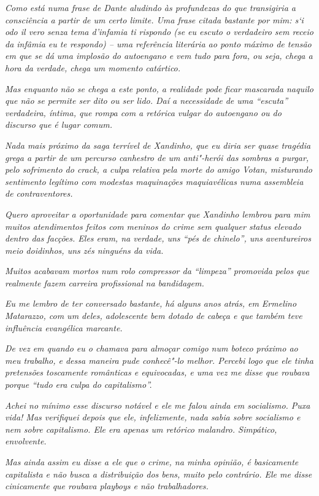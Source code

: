 \emph{Como está numa frase de Dante aludindo às profundezas do que
transigiria a consciência a partir de um certo limite. Uma frase citada
bastante por mim: s`i odo il vero senza tema d'infamia ti rispondo (se
eu escuto o verdadeiro sem receio da infâmia eu te respondo) -- uma
referência literária ao ponto máximo de tensão em que se dá uma implosão
do autoengano e vem tudo para fora, ou seja, chega a hora da verdade,
chega um momento catártico.}

\emph{Mas enquanto não se chega a este ponto, a realidade pode ficar
mascarada naquilo que não se permite ser dito ou ser lido. Daí a
necessidade de uma ``escuta'' verdadeira, íntima, que rompa com a
retórica vulgar do autoengano ou do discurso que é lugar comum.}

\emph{Nada mais próximo da saga terrível de Xandinho, que eu diria ser
quase tragédia grega a partir de um percurso canhestro de um anti"-herói
das sombras a purgar, pelo sofrimento do crack, a culpa relativa pela
morte do amigo Votan, misturando sentimento legítimo com modestas
maquinações maquiavélicas numa assembleia de contraventores.}

\emph{Quero aproveitar a oportunidade para comentar que Xandinho lembrou
para mim muitos atendimentos feitos com meninos do crime sem qualquer
status elevado dentro das facções. Eles eram, na verdade, uns ``pés de
chinelo'', uns aventureiros meio doidinhos, uns zés ninguéns da vida.}

\emph{Muitos acabavam mortos num rolo compressor da ``limpeza''
promovida pelos que realmente fazem carreira profissional na
bandidagem.}

\emph{Eu me lembro de ter conversado bastante, há alguns anos atrás, em
Ermelino Matarazzo, com um deles, adolescente bem dotado de cabeça e que
também teve influência evangélica marcante.}

\emph{De vez em quando eu o chamava para almoçar comigo num boteco
próximo ao meu trabalho, e dessa maneira pude conhecê"-lo melhor. Percebi
logo que ele tinha pretensões toscamente românticas e equivocadas, e uma
vez me disse que roubava porque ``tudo era culpa do capitalismo''.}

\emph{Achei no mínimo esse discurso notável e ele me falou ainda em
socialismo. Puxa vida! Mas verifiquei depois que ele, infelizmente, nada
sabia sobre socialismo e nem sobre capitalismo. Ele era apenas um
retórico malandro. Simpático, envolvente.}

\emph{Mas ainda assim eu disse a ele que o crime, na minha opinião, é
basicamente capitalista e não busca a distribuição dos bens, muito pelo
contrário. Ele me disse cinicamente que roubava playboys e não
trabalhadores.}

